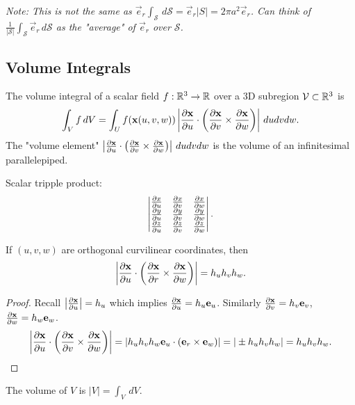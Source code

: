 \documentclass[10pt, a4paper]{article}
\begin{document}
\textit{Note:
This is not the same as $\vec{e}_r\int_{\mathcal{S}}\,d\mathcal{S} = \vec{e}_r|S| = 2\pi a ^ 2\vec{e}_r$.
Can think of $\frac{1}{|\mathcal{S}|}\int_{\mathcal{S}}\vec{e}_r\,d\mathcal{S}$ as the
"average"
of $\vec{e}_r$ over $\mathcal{S}$.
}

\subsection{Volume Integrals}
The volume integral of a scalar field $f : \R ^ 3 \to \R$ over a $3$D subregion $\mathcal{V} \subset \R ^ 3$ is
\[
\int_{V}f\,dV = \int_{U}f(\vec{x}(u, v, w))\left|\pd[\vec{x}]{u}\cdot\left(\pd[\vec{x}]{v} \times \pd[\vec{x}]{w}\right)\right|\,dudvdw.
\]
The "volume element" $\left|\pd[\vec{x}]{u} \cdot\left(\pd[\vec{x}]{v} \times \pd[\vec{x}]{w}\right)\right|\,dudvdw$ is the volume of an infinitesimal parallelepiped.

Scalar tripple product:
\[
\begin{vmatrix}
    \pd[x]{u} & \pd[x]{v} & \pd[x]{w} \\
    \pd[y]{u} & \pd[y]{v} & \pd[y]{w} \\
    \pd[z]{u} & \pd[z]{v} & \pd[z]{w}
\end{vmatrix}.
\]

\begin{proposition}
    If $(u, v, w)$ are orthogonal curvilinear coordinates,
    then
    \[
    \left|\pd[\vec{x}]{u} \cdot \left(\pd[\vec{x}]{r} \times \pd[\vec{x}]{w}\right)\right| = h_uh_vh_w.
    \]

    \begin{proof}
        Recall $\left|\pd[\vec{x}]{u}\right| = h_u$ which implies $\pd[\vec{x}]{u} = h_u\vec{e}_u$.
        Similarly $\pd[\vec{x}]{v} = h_v\vec{e}_v$,
        $\pd[\vec{x}]{w} = h_w\vec{e}_w$.
        \[
        \left|\pd[\vec{x}]{u} \cdot \left(\pd[\vec{x}]{v} \times \pd[\vec{x}]{w}\right)\right| = |h_uh_vh_w\vec{e}_u \cdot(\vec{e}_r \times \vec{e}_w)| = |\pm h_uh_vh_w| = h_uh_vh_w.
        \]
    \end{proof}
\end{proposition}
The volume of $V$ is $|V| = \int_{V}\,dV$.
\end{document}

